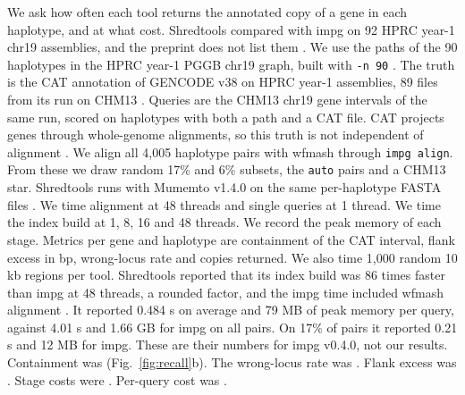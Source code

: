 We ask how often each tool returns the annotated copy of a gene in each haplotype, and at what cost.
Shredtools compared with impg on 92 HPRC year-1 chr19 assemblies, and the preprint does not list them \citep{Shivakumar2026shredtools}.
We use the paths of the 90 haplotypes in the HPRC year-1 PGGB chr19 graph, built with \texttt{-n 90} \citep{Liao2023hprc,Garrison2024pggb}.
The truth is the CAT annotation of GENCODE v38 on HPRC year-1 assemblies, 89 files from its run on CHM13 \citep{Fiddes2018cat,Frankish2021gencode}.
Queries are the CHM13 chr19 gene intervals of the same run, scored on haplotypes with both a path and a CAT file.
CAT projects genes through whole-genome alignments, so this truth is not independent of alignment \citep{Fiddes2018cat}.
We align all 4,005 haplotype pairs with wfmash through \texttt{impg align}.
From these we draw random 17\% and 6\% subsets, the \texttt{auto} pairs and a CHM13 star.
Shredtools runs with Mumemto v1.4.0 on the same per-haplotype FASTA files \citep{Shivakumar2025mumemto} .
We time alignment at 48 threads and single queries at 1 thread.
We time the index build at 1, 8, 16 and 48 threads.
We record the peak memory of each stage.
Metrics per gene and haplotype are containment of the CAT interval, flank excess in bp, wrong-locus rate and copies returned.
We also time 1,000 random 10 kb regions per tool.
Shredtools reported that its index build was 86 times faster than impg at 48 threads, a rounded factor, and the impg time included wfmash alignment \citep{Shivakumar2026shredtools}.
It reported 0.484 s on average and 79 MB of peak memory per query, against 4.01 s and 1.66 GB for impg on all pairs.
On 17\% of pairs it reported 0.21 s and 12 MB for impg.
These are their numbers for impg v0.4.0, not our results.
Containment was  (Fig.~\ref{fig:recall}b).
The wrong-locus rate was .
Flank excess was .
Stage costs were .
Per-query cost was .

